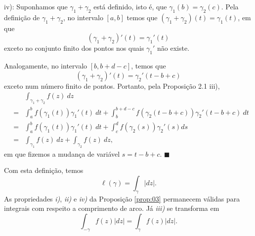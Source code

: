 iv): Suponhamos que $\gamma_1 + \gamma_2$ está definido, isto é, que $\gamma_1(b) = \gamma_2(c)$. Pela definição de $\gamma_1+\gamma_2$, no intervalo $[a, b]$ temos que $(\gamma_1+\gamma_2)(t) = \gamma_1(t)$, em que
$$(\gamma_1+\gamma_2)'(t) = \gamma_1'(t)$$
exceto no conjunto finito dos pontos nos quais $\gamma_1'$ não existe. 

Analogamente, no intervalo $[b, b+d-c]$, temos que
$$(\gamma_1+\gamma_2)'(t) = \gamma_2'(t-b+c)$$
exceto num número finito de pontos. Portanto, pela Proposição 2.1 iii),
\begin{eqnarray*}
&&\displaystyle\int_{\gamma_1+\gamma_2} f(z)~dz \\
&=& \displaystyle\int_{a}^{b} f(\gamma_1(t))\gamma_1'(t)~dt + \displaystyle\int_{b}^{b+d-c} f(\gamma_2(t-b+c))\gamma_2'(t-b+c)~dt\\
&=& \displaystyle\int_{a}^{b} f(\gamma_1(t))\gamma_1'(t)~dt + \displaystyle\int_{c}^{d} f(\gamma_2(s)) \gamma_2'(s) ds\\
&=& \displaystyle\int_{\gamma_1} f(z)~dz + \displaystyle\int_{\gamma_2} f(z)~dz,
\end{eqnarray*}
em que fizemos a mudança de variável $s=t-b+c$.
\hfill $\blacksquare$



Com esta definição, temos
$$\ell(\gamma) = \displaystyle\int_\gamma |dz|.$$
As propriedades \textit{i)}, \textit{ii)} e \textit{iv)} da Proposição \eqref{prop:03} permanecem válidas para integrais com respeito a comprimento de arco. Já \textit{iii)} se transforma em
$$\displaystyle\int_{-\gamma} f(z) |dz| = \displaystyle\int_\gamma f(z) |dz|.$$


